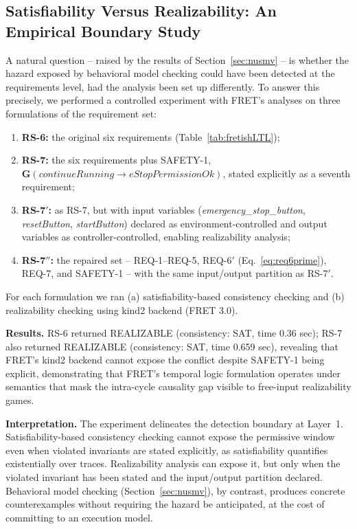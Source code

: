 \documentclass{ieeeaccess}
\theoremstyle{definition}
\newcommand{\G}{\mathbf{G}}
\begin{document}
\subsection{Satisfiability Versus Realizability: An Empirical Boundary Study}
\label{sec:fret_boundary}
A natural question -- raised by the results of Section~\ref{sec:nusmv} -- is whether the hazard exposed by behavioral model checking could have been detected at the requirements level, had the analysis been set up differently. To answer this precisely, we performed a controlled experiment with FRET's analyses on three formulations of the requirement set:

\begin{enumerate}
\item \textbf{RS-6:} the original six requirements (Table~\ref{tab:fretishLTL});
\item \textbf{RS-7:} the six requirements plus SAFETY-1, \\ $\G(\mathit{continueRunning} \rightarrow \mathit{eStopPermissionOk})$, stated explicitly as a seventh requirement;
\item \textbf{RS-7$'$:} as RS-7, but with input variables (\textit{emergency\_stop\_button}, \textit{resetButton}, \textit{startButton}) declared as environment-controlled and output variables as controller-controlled, enabling realizability analysis;
\item \textbf{RS-7$''$:} the repaired set -- REQ-1--REQ-5, REQ-6$'$ (Eq.~\eqref{eq:req6prime}), REQ-7, and SAFETY-1 -- with the same input/output partition as RS-7$'$.
\end{enumerate}

For each formulation we ran (a) satisfiability-based consistency checking and (b) realizability checking using kind2 backend (FRET 3.0).

\smallskip\noindent\textbf{Results.} RS-6 returned REALIZABLE (consistency: SAT, time 0.36 sec); RS-7 also returned REALIZABLE (consistency: SAT, time 0.659 sec), revealing that FRET's kind2 backend cannot expose the conflict despite SAFETY-1 being explicit, demonstrating that FRET's temporal logic formulation operates under semantics that mask the intra-cycle causality gap visible to free-input realizability games.

\smallskip\noindent\textbf{Interpretation.} The experiment delineates the detection boundary at Layer~1. Satisfiability-based consistency checking cannot expose the permissive window even when violated invariants are stated explicitly, as satisfiability quantifies existentially over traces. Realizability analysis can expose it, but only when the violated invariant has been stated and the input/output partition declared. Behavioral model checking (Section~\ref{sec:nusmv}), by contrast, produces concrete counterexamples without requiring the hazard be anticipated, at the cost of committing to an execution model.
\end{document}
